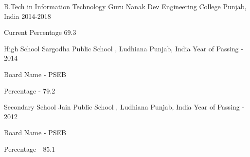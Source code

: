 


\begin{cventries}


\cventry
{B.Tech in Information Technology} %
{Guru Nanak Dev Engineering College} %
{Punjab, India} %
{2014-2018} %
{ %
\begin{cvitems}
\item {Current Percentage 69.3}
\end{cvitems}
}
 

\end{cventries}
\begin{cventries}


\cventry
{High School} %
{Sargodha Public School , Ludhiana} %
{Punjab, India} %
{Year of Passing - 2014} %
{ %
\begin{cvitems}
\item {Board Name - PSEB}
\item {Percentage - 79.2}
\end{cvitems}}
\end{cventries}
\begin{cventries}

\cventry
{Secondary School} %
{Jain Public School , Ludhiana} %
{Punjab, India} %
{Year of Passing - 2012} %
{ %
\begin{cvitems}
\item {Board Name - PSEB}
\item {Percentage - 85.1}
\end{cvitems}
}
 

\end{cventries}